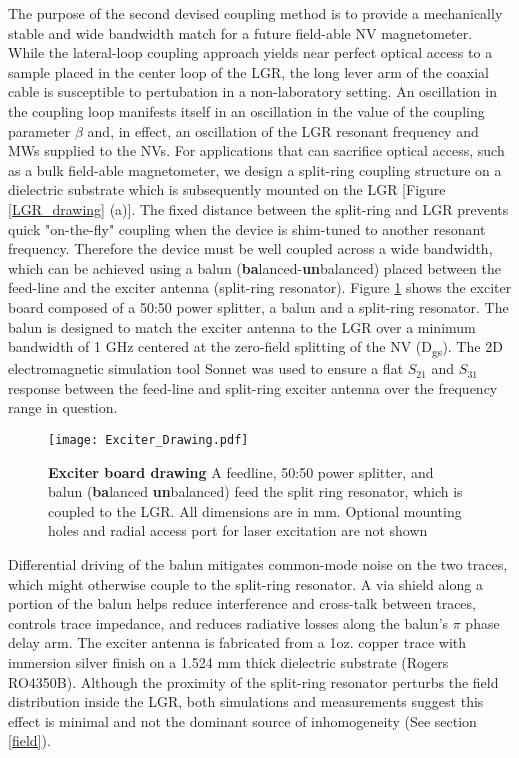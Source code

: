 The purpose of the second devised coupling method is to provide a mechanically stable and wide bandwidth match for a future field-able NV magnetometer. While the lateral-loop coupling approach yields near perfect optical access to a sample placed in the center loop of the LGR, the long lever arm of the coaxial cable is susceptible to pertubation in a non-laboratory setting. An oscillation in the coupling loop manifests itself in an oscillation in the value of the coupling parameter $\beta$ and, in effect, an oscillation of the LGR resonant frequency and MWs supplied to the NVs. For applications that can sacrifice optical access, such as a bulk field-able magnetometer, we design a split-ring coupling structure on a dielectric substrate which is subsequently mounted on the LGR [Figure \ref{LGR_drawing} (a)]. The fixed distance between the split-ring and LGR prevents quick "on-the-fly" coupling when the device is shim-tuned to another resonant frequency. Therefore the device must be well coupled across a wide bandwidth, which can be achieved using a balun (\textbf{ba}lanced-\textbf{un}balanced) placed between the feed-line and the exciter antenna (split-ring resonator). Figure \ref{LGR_Exciter} shows the exciter board composed of a 50:50 power splitter, a balun and a split-ring resonator. The balun is designed to match the exciter antenna to the LGR over a minimum bandwidth of 1 GHz centered at the zero-field splitting of the NV (D\textsubscript{gs}). The 2D electromagnetic simulation tool Sonnet was used to ensure a flat $S_{21}$ and $S_{31}$ response between the feed-line and split-ring exciter antenna over the frequency range in question. 

\begin{figure}[t!]
\centering
\texttt{[image: Exciter\_Drawing.pdf]}  
\caption{\textbf{Exciter board drawing} A feedline, 50:50 power splitter, and balun (\textbf{ba}lanced \textbf{un}balanced) feed the split ring resonator, which is coupled to the LGR. All dimensions are in mm. Optional mounting holes and radial access port for laser excitation are not shown}
\label{LGR_Exciter}
\end{figure}

Differential driving of the balun mitigates common-mode noise on the two traces, which might otherwise couple to the split-ring resonator. A via shield along a portion of the balun helps reduce interference and cross-talk between traces, controls trace impedance, and reduces radiative losses along the balun's $\pi$ phase delay arm. The exciter antenna is fabricated from a 1oz. copper trace with immersion silver finish on a 1.524 mm thick dielectric substrate (Rogers RO4350B). Although the proximity of the split-ring resonator perturbs the field distribution inside the LGR, both simulations and measurements suggest this effect is minimal and not the dominant source of inhomogeneity (See section \ref{field}).  

